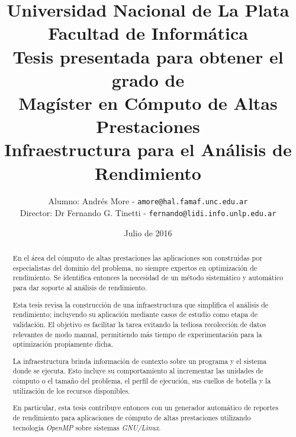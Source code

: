 \documentclass[a4paper]{report}
\begin{document}
\setlength{\parindent}{0cm}
\renewcommand{\tablename}{Tabla}

\title{Universidad Nacional de La Plata\\Facultad de Informática\\ \bigskip
{\large Tesis presentada para obtener el grado de \\}  Magíster en Cómputo de Altas Prestaciones\\ \bigskip
  Infraestructura para el Análisis de Rendimiento}

\author{
  Alumno: Andrés More - {\tt amore@hal.famaf.unc.edu.ar}\\
  Director: Dr Fernando G. Tinetti - {\tt fernando@lidi.info.unlp.edu.ar}
}

\date{Julio de 2016}

\maketitle

\begin{abstract}

En el área del cómputo de altas prestaciones las aplicaciones son construidas por especialistas del dominio del problema, no siempre expertos en optimización de rendimiento. Se identifica entonces la necesidad de un método sistemático y automático para dar soporte al análisis de rendimiento.

\bigskip

Esta tesis revisa la construcción de una infraestructura que simplifica el análisis de rendimiento; incluyendo su aplicación mediante casos de estudio como etapa de validación. El objetivo es facilitar la tarea evitando la tediosa recolección de datos relevantes de modo manual, permitiendo más tiempo de experimentación para la optimización propiamente dicha.

\bigskip

La infraestructura brinda información de contexto sobre un programa y el sistema donde se ejecuta. Esto incluye su comportamiento al incrementar las unidades de cómputo o el tamaño del problema,
el perfil de ejecución, sus cuellos de botella y la utilización de los recursos disponibles.

\bigskip

En particular, esta tesis contribuye entonces con un generador automático de reportes de rendimiento para aplicaciones de cómputo de altas prestaciones utilizando tecnología {\it OpenMP} sobre sistemas {\it GNU/Linux}.

\end{abstract}
\end{document}
